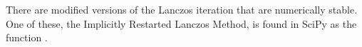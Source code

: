 There are modified versions of the Lanczos iteration that are numerically stable.
One of these, the Implicitly Restarted Lanczos Method, is found in SciPy as the function .

